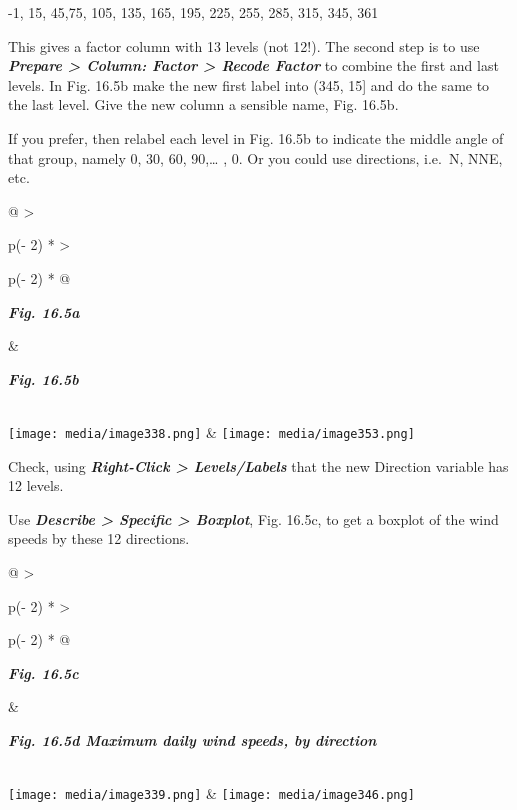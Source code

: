 \documentclass[
  letterpaper,
  DIV=11,
  numbers=noendperiod]{scrreprt}
\begin{document}
-1, 15, 45,75, 105, 135, 165, 195, 225, 255, 285, 315, 345, 361

This gives a factor column with 13 levels (not 12!). The second step is
to use \textbf{\emph{Prepare \textgreater{} Column: Factor
\textgreater{} Recode Factor}} to combine the first and last levels. In
Fig. 16.5b make the new first label into (345, 15{]} and do the same to
the last level. Give the new column a sensible name, Fig. 16.5b.

If you prefer, then relabel each level in Fig. 16.5b to indicate the
middle angle of that group, namely 0, 30, 60, 90,\ldots{} , 0. Or you
could use directions, i.e.~N, NNE, etc.

\begin{longtable}[]{@{}
  >{\raggedright\arraybackslash}p{(\columnwidth - 2\tabcolsep) * }
  >{\raggedright\arraybackslash}p{(\columnwidth - 2\tabcolsep) * }@{}}
\toprule\noalign{}
\begin{minipage}[b]{\linewidth}\raggedright
\textbf{\emph{Fig. 16.5a}}
\end{minipage} & \begin{minipage}[b]{\linewidth}\raggedright
\textbf{\emph{Fig. 16.5b}}
\end{minipage} \\
\midrule\noalign{}
\endhead
\bottomrule\noalign{}
\endlastfoot
\texttt{[image: media/image338.png]} &
\texttt{[image: media/image353.png]} \\
\end{longtable}

Check, using \textbf{\emph{Right-Click \textgreater{} Levels/Labels}}
that the new Direction variable has 12 levels.

Use \textbf{\emph{Describe \textgreater{} Specific \textgreater{}
Boxplot}}, Fig. 16.5c, to get a boxplot of the wind speeds by these 12
directions.

\begin{longtable}[]{@{}
  >{\raggedright\arraybackslash}p{(\columnwidth - 2\tabcolsep) * }
  >{\raggedright\arraybackslash}p{(\columnwidth - 2\tabcolsep) * }@{}}
\toprule\noalign{}
\begin{minipage}[b]{\linewidth}\raggedright
\textbf{\emph{Fig. 16.5c}}
\end{minipage} & \begin{minipage}[b]{\linewidth}\raggedright
\textbf{\emph{Fig. 16.5d Maximum daily wind speeds, by direction}}
\end{minipage} \\
\midrule\noalign{}
\endhead
\bottomrule\noalign{}
\endlastfoot
\texttt{[image: media/image339.png]} &
\texttt{[image: media/image346.png]} \\
\end{longtable}
\end{document}
